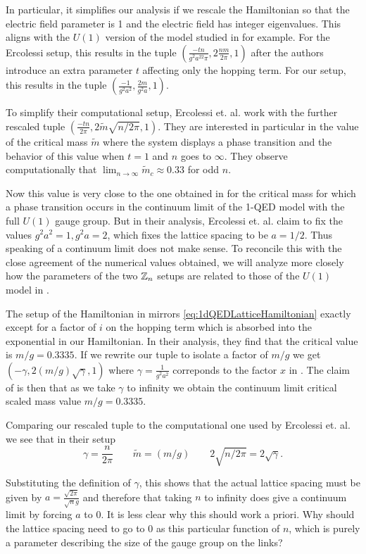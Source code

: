 \documentclass[11pt,reqno]{amsart}
\begin{document}
	In particular, it simplifies our analysis if we rescale the Hamiltonian so that the electric field parameter is 1 and the electric field has integer eigenvalues.
	This aligns with the $U(1)$ version of the model studied in \cite{Byrnes02} for example.
	For the Ercolessi setup, this results in the tuple $(\frac{-tn}{g^2a^22\pi},2\frac{nm}{2\pi},1)$ after the authors introduce an extra parameter $t$ affecting only the hopping term.
	For our setup, this results in the tuple $(\frac{-1}{g^2a^2},\frac{2m}{g^2a},1)$.
	
	To simplify their computational setup, Ercolessi et. al. work with the further rescaled tuple $(\frac{-tn}{2\pi},2\tilde{m}\sqrt{n/2\pi},1)$.
	They are interested in particular in the value of the critical mass $\tilde{m}$ where the system displays a phase transition and the behavior of this value when $t=1$ and $n$ goes to $\infty$.
	They observe computationally that $\lim_{n\to \infty} \tilde{m}_c \approx 0.33$ for odd $n$.
	
	Now this value is very close to the one obtained in \cite{Byrnes02} for the critical mass for which a phase transition occurs in the continuum limit of the 1-QED model with the full $U(1)$ gauge group.
	But in their analysis, Ercolessi et. al. claim to fix the values $g^2a^2=1, g^2a=2$, which fixes the lattice spacing to be $a=1/2$.
	Thus speaking of a continuum limit does not make sense.
	To reconcile this with the close agreement of the numerical values obtained, we will analyze more closely how the parameters of the two $\mathbb{Z}_n$ setups are related to those of the $U(1)$ model in \cite{Byrnes02}.
	
	The setup of the Hamiltonian in \cite{Byrnes02} mirrors \cref{eq:1dQEDLatticeHamiltonian} exactly except for a factor of $i$ on the hopping term which is absorbed into the exponential in our Hamiltonian.
	In their analysis, they find that the critical value is $m/g=0.3335$.
	If we rewrite our tuple to isolate a factor of $m/g$ we get $(-\gamma,2(m/g)\sqrt{\gamma},1)$ where $\gamma=\frac{1}{g^2a^2}$ correponds to the factor $x$ in \cite{Byrnes02}.
	The claim of \cite{Byrnes02} is then that as we take $\gamma$ to infinity we obtain the continuum limit critical scaled mass value $m/g=0.3335$.
	
	Comparing our rescaled tuple to the computational one used by Ercolessi et. al. we see that in their setup 
		\[\gamma=\frac{n}{2\pi} \qquad  \tilde{m}=(m/g) \qquad 2\sqrt{n/2\pi}=2\sqrt{\gamma}. \]
	
	Substituting the definition of $\gamma$, this shows that the actual lattice spacing must be given by $a=\frac{\sqrt{2\pi}}{\sqrt{n}g}$ and therefore that taking $n$ to infinity does give a continuum limit by forcing $a$ to 0.
	It is less clear why this should work a priori. 
	Why should the lattice spacing need to go to 0 as this particular function of $n$, which is purely a parameter describing the size of the gauge group on the links?
	
\end{document}
